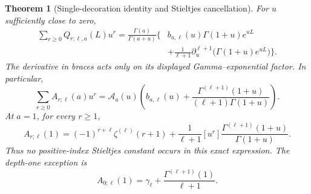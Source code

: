 \documentclass[11pt,oneside]{article}
\numberwithin{equation}{section}
\newtheorem{theorem}{Theorem}[section]
\theoremstyle{definition}
\theoremstyle{remark}
\newcommand{\Acal}{\mathcal A}
\begin{document}
\begin{theorem}[Single-decoration identity and Stieltjes cancellation]
\label{thm:single-decoration}
For $u$ sufficiently close to zero,
\begin{equation}\label{eq:single-full}
\begin{split}
\sum_{r\ge0}Q_{r;\ell,a}(L)u^r
=\frac{\Gamma(a)}{\Gamma(a+u)}\biggl\{
 &b_{a,\ell}(u)\Gamma(1+u)e^{uL}\\
 &+\frac{1}{\ell+1}\partial_u^{\ell+1}
                \bigl(\Gamma(1+u)e^{uL}\bigr)\biggr\}.
\end{split}
\end{equation}
The derivative in braces acts only on its displayed Gamma--exponential
factor. In particular,
\begin{equation}\label{eq:single-constant}
\boxed{\displaystyle
\sum_{r\ge0}A_{r;\ell}(a)u^r
=\Acal_a(u)\left(b_{a,\ell}(u)
 +\frac{\Gamma^{(\ell+1)}(1+u)}{(\ell+1)\Gamma(1+u)}\right).}
\end{equation}
At $a=1$, for every $r\ge1$,
\begin{equation}\label{eq:single-cancellation}
\boxed{\displaystyle
A_{r;\ell}(1)=(-1)^{r+\ell}\zeta^{(\ell)}(r+1)
 +\frac1{\ell+1}[u^r]
             \frac{\Gamma^{(\ell+1)}(1+u)}{\Gamma(1+u)}.}
\end{equation}
Thus no positive-index Stieltjes constant occurs in this exact expression.
The depth-one exception is
\begin{equation}\label{eq:depth-one-decoration}
A_{0;\ell}(1)=\gamma_\ell+
                    \frac{\Gamma^{(\ell+1)}(1)}{\ell+1}.
\end{equation}
\end{theorem}
\end{document}
